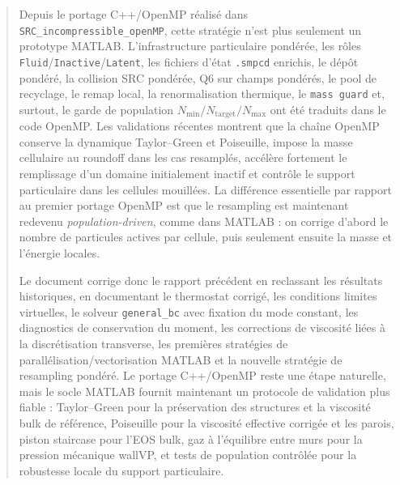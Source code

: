 \documentclass[11pt,a4paper]{article}
\begin{document}
\begin{abstract}
Depuis le portage C++/OpenMP réalisé dans \texttt{SRC\_incompressible\_openMP}, cette stratégie n'est plus seulement un prototype MATLAB. L'infrastructure particulaire pondérée, les rôles \texttt{Fluid}/\texttt{Inactive}/\texttt{Latent}, les fichiers d'état \texttt{.smpcd} enrichis, le dépôt pondéré, la collision SRC pondérée, Q6 sur champs pondérés, le pool de recyclage, le remap local, la renormalisation thermique, le \texttt{mass guard} et, surtout, le garde de population $N_{\min}/N_{\mathrm{target}}/N_{\max}$ ont été traduits dans le code OpenMP. Les validations récentes montrent que la chaîne OpenMP conserve la dynamique Taylor--Green et Poiseuille, impose la masse cellulaire au roundoff dans les cas resamplés, accélère fortement le remplissage d'un domaine initialement inactif et contrôle le support particulaire dans les cellules mouillées. La différence essentielle par rapport au premier portage OpenMP est que le resampling est maintenant redevenu \emph{population-driven}, comme dans MATLAB : on corrige d'abord le nombre de particules actives par cellule, puis seulement ensuite la masse et l'énergie locales.

Le document corrige donc le rapport précédent en reclassant les résultats historiques, en documentant le thermostat corrigé, les conditions limites virtuelles, le solveur \texttt{general\_bc} avec fixation du mode constant, les diagnostics de conservation du moment, les corrections de viscosité liées à la discrétisation transverse, les premières stratégies de parallélisation/vectorisation MATLAB et la nouvelle stratégie de resampling pondéré. Le portage C++/OpenMP reste une étape naturelle, mais le socle MATLAB fournit maintenant un protocole de validation plus fiable : Taylor--Green pour la préservation des structures et la viscosité bulk de référence, Poiseuille pour la viscosité effective corrigée et les parois, piston staircase pour l'EOS bulk, gaz à l'équilibre entre murs pour la pression mécanique wallVP, et tests de population contrôlée pour la robustesse locale du support particulaire.



\end{abstract}
\end{document}
